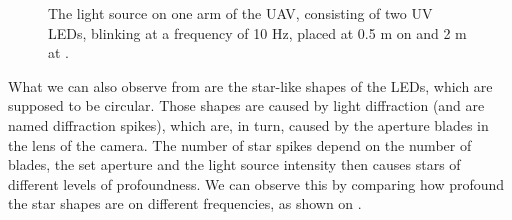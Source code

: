\begin{figure}[H]
	\centering
	\caption{
  The light source on one arm of the UAV, consisting of two UV LEDs, blinking at a frequency of 10 Hz,
  placed at 0.5 m on  and 2 m at .
  }
	\label{fig:leds}
\end{figure}
What we can also observe from  are the star-like shapes of the LEDs, which are supposed to be circular.
Those shapes are caused by light diffraction (and are named diffraction spikes), which are, in turn, caused by the aperture
blades in the lens of the camera. The number
of star spikes depend on the number of blades, the set aperture and the light source intensity then causes stars of different
levels of profoundness.\cite{lendermann2018computational} We can observe this by comparing how profound the star shapes are on different
frequencies, as shown on .

